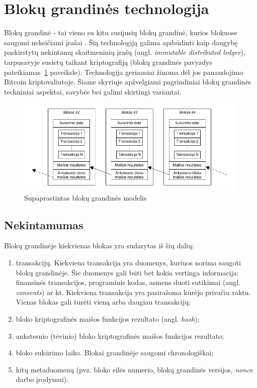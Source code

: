 \section{Blokų grandinės technologija}

Blokų grandinė - tai vieno su kitu susijusių blokų grandinė, kurios blokuose saugomi
nekeičiami įrašai \cite{SatoshiNakamoto}. Šią technologiją galima apibūdinti kaip daugybę paskirstytų nekintamų skaitmeninių įrašų 
(angl. \textit{immutable distributed ledger}), tarpusavyje susietų taikant kriptografiją (blokų grandinės pavyzdys pateikiamas~\ref{fig:blockchain} paveiksle). Technologija geriausiai žinoma dėl jos panaudojimo Bitcoin kriptovaliutoje.
Šiame skyriuje apžvelgiami pagrindiniai blokų grandinės techniniai aspektai, savybės bei galimi skirtingi variantai.

\begin{figure}[H]
    \centering
    \includegraphics[scale=0.6]{img/blockchain}
    \caption{Supaprastintas blokų grandinės modelis}
    \label{fig:blockchain}
\end{figure}

\subsection{Nekintamumas}

Blokų grandinėje kiekvienas blokas yra sudarytas iš šių dalių:

\begin{enumerate}
    \item transakcijų. Kiekviena transakcija yra duomenys, kuriuos norima saugoti blokų grandinėje. Šie duomenys gali būti bet kokia vertinga informacija:
    finansinės transakcijos, programinis kodas, asmens duoti sutikimai (angl. \textit{consents}) ar kt. Kiekviena transakcija yra pasirašoma
    kūrėjo privačiu raktu. Vienas blokas gali turėti vieną arba daugiau transakcijų;
    \item bloko kriptografinės maišos funkcijos rezultato (angl. \textit{hash});
    \item ankstesnio (tėvinio) bloko kriptografinės maišos funkcijos rezultato;
    \item bloko sukūrimo laiko. Blokai grandinėje saugomi chronologiškai;
    \item kitų metaduomenų (pvz. bloko eilės numerio, blokų grandinės versijos, \textit{nonce} darbo įrodymui).
\end{enumerate}

